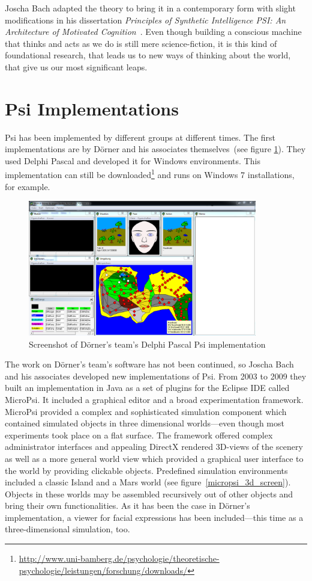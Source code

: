 Joscha Bach adapted the theory to bring it in a contemporary form with slight modifications in his dissertation \emph{Principles of Synthetic Intelligence PSI: An Architecture of Motivated Cognition}~\cite{Bach:2009:PSI:1611304}. Even though building a conscious machine that thinks and acts as we do is still mere science-fiction, it is this kind of foundational research, that leads us to new ways of thinking about the world, that give us our most significant leaps.
    
    \section{Psi Implementations}
Psi has been implemented by different groups at different times. The first implementations are by Dörner and his associates themselves~(see figure \ref{psi_screen}). They used Delphi Pascal and developed it for Windows environments. This implementation can still be downloaded\footnote{\url{http://www.uni-bamberg.de/psychologie/theoretische-psychologie/leistungen/forschung/downloads/}} and runs on Windows 7 installations, for example. 

\begin{figure}[h]
  \centering
    \includegraphics[width=10cm]{graphics/psi_screen1}
  \caption{Screenshot of Dörner's team's Delphi Pascal Psi implementation}
  \label{psi_screen}
\end{figure}

The work on Dörner's team's software has not been continued, so Joscha Bach and his associates developed new implementations of Psi. From 2003 to 2009 they built an implementation in Java as a set of plugins for the Eclipse IDE called MicroPsi. It included a graphical editor and a broad experimentation framework. MicroPsi provided a complex and sophisticated simulation component which contained simulated objects in three dimensional worlds---even though most experiments took place on a flat surface. The framework offered complex administrator interfaces and appealing DirectX rendered 3D-views of the scenery as well as a more general world view which provided a graphical user interface to the world by providing clickable objects. Predefined simulation environments included a classic Island and a Mars world (see figure~\ref{micropsi_3d_screen}). Objects in these worlds may be assembled recursively out of other objects and bring their own functionalities. As it has been the case in Dörner's implementation, a viewer for facial expressions has been included---this time as a three-dimensional simulation, too.~\cite{Bach:2009:PSI:1611304}


